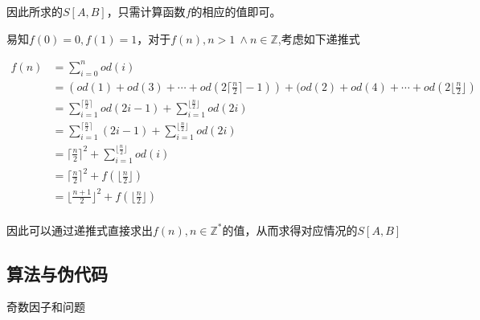\documentclass{article}
\begin{document}
因此所求的$S[A,B]$，只需计算函数$f$的相应的值即可。

易知$f(0) = 0, f(1) = 1$，对于$f(n), n > 1\ \wedge n  \in \mathds{Z}$,考虑如下递推式

\begin{align*}
    f(n)&=\sum_{i=0}^n od(i)\\
        &=(od(1) + od(3) + \cdots + od(2 \lceil \frac{n}{2} \rceil-1)) + (od(2) + od(4) + \cdots + od(2 \lfloor \frac{n}{2} \rfloor) \\
        &=\sum_{i=1}^{\lceil \frac{n}{2} \rceil} od(2i-1) +  \sum_{i=1}^{\lfloor \frac{n}{2} \rfloor} od(2i)\\
        &=\sum_{i=1}^{\lceil \frac{n}{2} \rceil} (2i-1) +  \sum_{i=1}^{\lfloor \frac{n}{2} \rfloor} od(2i)\\
        &=\lceil \frac{n}{2} \rceil^2+\sum_{i=1}^{\lfloor \frac{n}{2} \rfloor} od(i)\\
        &=\lceil \frac{n}{2} \rceil^2+f(\lfloor \frac{n}{2} \rfloor)\\
        &=\lfloor \frac{n+1}{2} \rfloor^2+f(\lfloor \frac{n}{2} \rfloor)\\
\end{align*}

因此可以通过递推式直接求出$f(n), n  \in \mathds{Z}^*$的值，从而求得对应情况的$S[A,B]$

\subsection{算法与伪代码}

\begin{algorithm}[H]

\caption{奇数因子和问题}
\LinesNumbered
{}


\end{algorithm}
\end{document}
